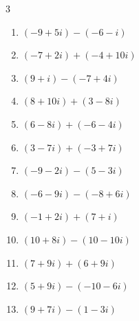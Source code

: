\begin{multicols}{3}
\begin{enumerate}
        \phantom{$\displaystyle =-9-6i$}

  \item $\displaystyle (-9+5i) - (-6-i)$

        \phantom{$\displaystyle =-3+6i$}

  \item $\displaystyle (-7+2i) + (-4+10i)$

        \phantom{$\displaystyle =-11+12i$}

  \item $\displaystyle (9+i) - (-7+4i)$

        \phantom{$\displaystyle =16-3i$}

  \item $\displaystyle (8+10i) + (3-8i)$

        \phantom{$\displaystyle =11+2i$}

  \item $\displaystyle (6-8i) + (-6-4i)$

        \phantom{$\displaystyle =-12i$}

  \item $\displaystyle (3-7i) + (-3+7i)$

        \phantom{$\displaystyle =0$}

  \item $\displaystyle (-9-2i) - (5-3i)$

        \phantom{$\displaystyle =-14+i$}

  \item $\displaystyle (-6-9i) - (-8+6i)$

        \phantom{$\displaystyle =2-15i$}

  \item $\displaystyle (-1+2i) + (7+i)$

        \phantom{$\displaystyle =6+3i$}

  \item $\displaystyle (10+8i) - (10-10i)$

        \phantom{$\displaystyle =18i$}

\columnbreak %

  \item $\displaystyle (7+9i) + (6+9i)$

        \phantom{$\displaystyle =13+18i$}

  \item $\displaystyle (5+9i) - (-10-6i)$

        \phantom{$\displaystyle =15+15i$}

  \item $\displaystyle (9+7i) - (1-3i)$


\end{enumerate}
\end{multicols}
